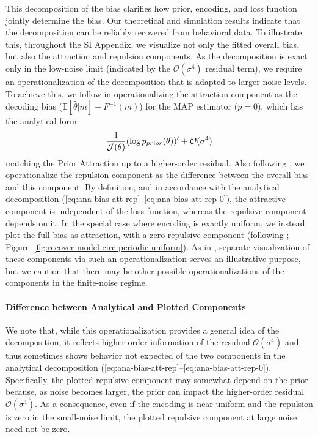 \documentclass[si.tex]{subfiles}
\begin{document}
This decomposition of the bias clarifies how prior, encoding, and loss function jointly determine the bias.
Our theoretical and simulation results indicate that the decomposition can be reliably recovered from behavioral data.
To illustrate this, throughout the SI Appendix, we visualize not only the fitted overall bias, but also the attraction and repulsion components.
As the decomposition is exact only in the low-noise limit (indicated by the $\mathcal{O}(\sigma^4)$ residual term), we require an operationalization of the decomposition that is adapted to larger noise levels.
To achieve this, we follow \cite{hahn2024unifying} in operationalizing the attraction component as the decoding bias ($\mathbb{E}[{\widehat{\theta}}|m] - F^{-1}(m)$) for the MAP estimator ($p=0$), which has the analytical form
\begin{equation}
    \frac{1}{\mathcal{J}(\theta)} (\log p_{prior}(\theta))' + \mathcal{O}(\sigma^4)
\end{equation}
matching the Prior Attraction up to a higher-order residual.
Also following \cite{hahn2024unifying}, we operationalize the repulsion component as the difference between the overall bias and this component.
By definition, and in accordance with the analytical decomposition (\ref{eq:ana-bias-att-rep}--\ref{eq:ana-bias-att-rep-0}), the attractive component is independent of the loss function, whereas the repulsive component depends on it.
In the special case where encoding is exactly uniform, we instead plot the full bias as attraction, with a zero repulsive component (following \cite{hahn2024unifying}; Figure~\ref{fig:recover-model-circ-periodic-uniform}).
As in \cite{hahn2024unifying}, separate visualization of these components via such an operationalization serves an illustrative purpose, but we caution that there may be other possible operationalizations of the components in the finite-noise regime.

\paragraph*{Difference between Analytical and Plotted Components}
We note that, while this operationalization provides a general idea of the decomposition, it reflects higher-order information of the residual $\mathcal{O}(\sigma^4)$ and thus sometimes shows behavior not expected of the two components in the analytical decomposition (\ref{eq:ana-bias-att-rep}--\ref{eq:ana-bias-att-rep-0}). Specifically, the plotted repulsive component may somewhat depend on the prior because, as noise becomes larger, the prior can impact the higher-order residual $\mathcal{O}(\sigma^4)$. As a consequence, even if the encoding is near-uniform and the repulsion is zero in the small-noise limit, the plotted repulsive component at large noise need not be zero.
\end{document}
